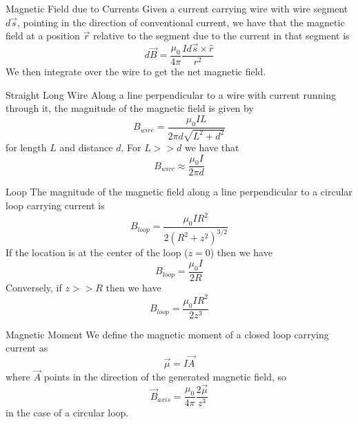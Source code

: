 \documentclass[12pt]{report}
\begin{document}
\begin{defn}{Magnetic Field due to Currents}{}
        Given a current carrying wire with wire segment $d\vec{s}$, pointing in the direction of conventional current, we have that the magnetic field at a position $\vec{r}$ relative to the segment due to the current in that segment is \begin{equation}
                d\vec{B} = \frac{\mu_0}{4\pi} \frac{Id\vec{s}\times \hat{r}}{r^2}
        \end{equation}
        We then integrate over the wire to get the net magnetic field.
\end{defn}

\begin{prop}{Straight Long Wire}{}
        Along a line perpendicular to a wire with current running through it, the magnitude of the magnetic field is given by \begin{equation}
                B_{wire} = \frac{\mu_0IL}{2\pi d\sqrt{L^2+d^2}}
        \end{equation}
        for length $L$ and distance $d$. For $L >> d$ we have that \begin{equation}
                B_{wire} \approx \frac{\mu_0I}{2\pi d}
        \end{equation}
\end{prop}


\begin{prop}{Loop}{}
        The magnitude of the magnetic field along a line perpendicular to a circular loop carrying current is \begin{equation}
                B_{loop} = \frac{\mu_0IR^2}{2(R^2+z^2)^{3/2}}
        \end{equation}
        If the location is at the center of the loop ($z = 0$) then we have \begin{equation}
                B_{loop} = \frac{\mu_0I}{2R}
        \end{equation}
        Conversely, if $z >> R$ then we have \begin{equation}
                B_{loop} = \frac{\mu_0IR^2}{2z^3}
        \end{equation}
\end{prop}

\begin{defn}{Magnetic Moment}{}
        We define the magnetic moment of a closed loop carrying current as \begin{equation}
                \vec{\mu} = I\vec{A}
        \end{equation}
        where $\vec{A}$ points in the direction of the generated magnetic field, so \begin{equation}
                \vec{B}_{axis} = \frac{\mu_0}{4\pi}\frac{2\vec{\mu}}{z^3}
        \end{equation}
        in the case of a circular loop.
\end{defn}
\end{document}
